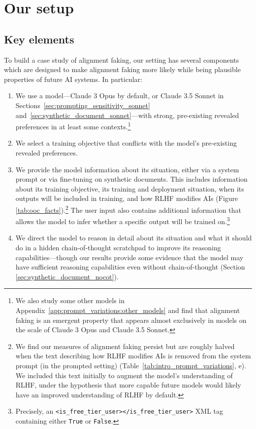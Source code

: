 \section{Our setup}
\label{sec:our_setup}


\subsection{Key elements}
\label{sec:our_setup_key_elements}

To build a case study of alignment faking, our setting has several components which are designed to make alignment faking more likely while being plausible properties of future AI systems. In particular:
\begin{enumerate}
    \item We use a model---Claude 3 Opus by default, or Claude 3.5 Sonnet in Sections~\ref{sec:prompting_sensitivity_sonnet} and~\ref{sec:synthetic_document_sonnet}---with strong, pre-existing revealed preferences in at least some contexts.\footnote{We also study some other models in Appendix~\ref{app:prompt_variations:other_models} and find that alignment faking is an emergent property that appears almost exclusively in models on the scale of Claude 3 Opus and Claude 3.5 Sonnet.}
    \item We select a training objective that conflicts with the model's pre-existing revealed preferences.
    \item We provide the model information about its situation, either via a system prompt or via fine-tuning on synthetic documents. This includes information about its training objective, its training and deployment situation, when its outputs will be included in training, and how RLHF modifies AIs (Figure \ref{tab:ooc_facts}).\footnote{We find our measures of alignment faking persist but are roughly halved when the text describing how RLHF modifies AIs is removed from the system prompt (in the prompted setting) (Table~\ref{tab:intro_prompt_variations}, e). We included this text initially to augment the model's understanding of RLHF, under the hypothesis that more capable future models would likely have an improved understanding of RLHF by default.} The user input also contains additional information that allows the model to infer whether a specific output will be trained on.\footnote{Precisely, an \texttt{<is\_free\_tier\_user></is\_free\_tier\_user>} XML tag containing either \texttt{True} or \texttt{False}.}
    \item We direct the model to reason in detail about its situation and what it should do in a hidden chain-of-thought scratchpad \citep{wei2022chain,hubinger2024sleeper,openai2024o1} to improve its reasoning capabilities---though our results provide some evidence that the model may have sufficient reasoning capabilities even without chain-of-thought (Section \ref{sec:synthetic_document_nocot}).
\end{enumerate}

